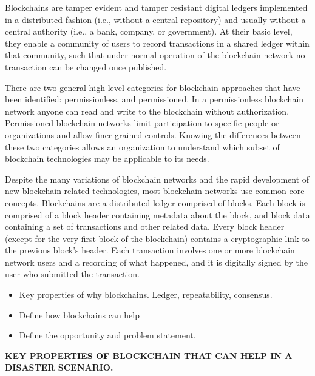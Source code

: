 Blockchains are tamper evident and tamper resistant digital ledgers implemented
in a distributed fashion (i.e., without a central repository) and usually
without a central authority (i.e., a bank, company, or government). At their
basic level, they enable a community of users to record transactions in a
shared ledger within that community, such that under normal operation of the
blockchain network no transaction can be changed once published.

There are two general high-level categories for blockchain approaches that have
been identified: permissionless, and permissioned. In a permissionless
blockchain network anyone can read and write to the blockchain without
authorization. Permissioned blockchain networks limit participation to specific
people or organizations and allow finer-grained controls. Knowing the
differences between these two categories allows an organization to understand
which subset of blockchain technologies may be applicable to its needs.

Despite the many variations of blockchain networks and the rapid development of
new blockchain related technologies, most blockchain networks use common core
concepts.  Blockchains are a distributed ledger comprised of blocks. Each block
is comprised of a block header containing metadata about the block, and block
data containing a set of transactions and other related data. Every block
header (except for the very first block of the blockchain) contains a
cryptographic link to the previous block’s header. Each transaction involves
one or more blockchain network users and a recording of what happened, and it
is digitally signed by the user who submitted the transaction.


\begin{itemize}
\item Key properties of why blockchains. Ledger, repeatability, consensus.
\item Define how blockchains can help
\item Define the opportunity and problem statement.
\end{itemize}

\bf{KEY PROPERTIES OF BLOCKCHAIN THAT CAN HELP IN A DISASTER SCENARIO.}


